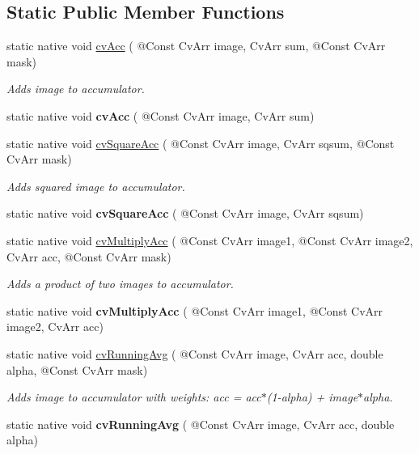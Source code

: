 \subsection*{Static Public Member Functions}
\begin{DoxyCompactItemize}
\item 
static native void \hyperlink{group__imgproc__c_ga59fe63bcfa209c1ced0035aca7d47f26}{cv\+Acc} ( @Const Cv\+Arr image, Cv\+Arr sum, @Const Cv\+Arr mask)
\begin{DoxyCompactList}\small\item\em Adds image to accumulator. \end{DoxyCompactList}\item 
static native void {\bfseries cv\+Acc} ( @Const Cv\+Arr image, Cv\+Arr sum)
\item 
static native void \hyperlink{group__imgproc__c_ga8c1d632da04d1ddc6e38b712f03adbe8}{cv\+Square\+Acc} ( @Const Cv\+Arr image, Cv\+Arr sqsum, @Const Cv\+Arr mask)
\begin{DoxyCompactList}\small\item\em Adds squared image to accumulator. \end{DoxyCompactList}\item 
static native void {\bfseries cv\+Square\+Acc} ( @Const Cv\+Arr image, Cv\+Arr sqsum)
\item 
static native void \hyperlink{group__imgproc__c_ga364a4081ca71e440b95082410d922f9c}{cv\+Multiply\+Acc} ( @Const Cv\+Arr image1, @Const Cv\+Arr image2, Cv\+Arr acc, @Const Cv\+Arr mask)
\begin{DoxyCompactList}\small\item\em Adds a product of two images to accumulator. \end{DoxyCompactList}\item 
static native void {\bfseries cv\+Multiply\+Acc} ( @Const Cv\+Arr image1, @Const Cv\+Arr image2, Cv\+Arr acc)
\item 
static native void \hyperlink{group__imgproc__c_gaf06fc48b42683511a2fc75d1fe34b2e8}{cv\+Running\+Avg} ( @Const Cv\+Arr image, Cv\+Arr acc, double alpha, @Const Cv\+Arr mask)
\begin{DoxyCompactList}\small\item\em Adds image to accumulator with weights\+: acc = acc$\ast$(1-\/alpha) + image$\ast$alpha. \end{DoxyCompactList}\item 
static native void {\bfseries cv\+Running\+Avg} ( @Const Cv\+Arr image, Cv\+Arr acc, double alpha)

\end{DoxyCompactItemize}
